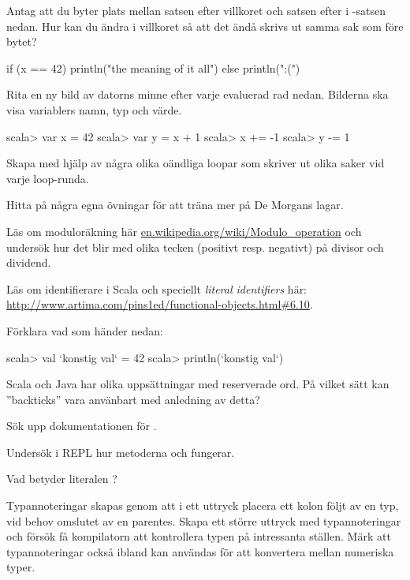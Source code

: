 {{{{{{{\Task\Pen Antag att du byter plats mellan satsen efter villkoret och satsen efter  i -satsen nedan. Hur kan du ändra i villkoret så att det ändå skrivs ut samma sak som före bytet?
\begin{Code}
if (x == 42) println("the meaning of it all") else println(":(")
\end{Code}

\Task\Pen Rita en ny bild av datorns minne efter varje evaluerad rad nedan. Bilderna ska visa variablers namn, typ och värde.
\begin{REPL}
scala> var x = 42
scala> var y = x + 1
scala> x += -1
scala> y -= 1
\end{REPL}

\Task Skapa med hjälp av  några olika oändliga loopar som skriver ut olika saker vid varje loop-runda.

\Task Hitta på några egna övningar för att träna mer på De Morgans lagar.



\clearpage

\AdvancedTasks

\Task Läs om moduloräkning här \href{https://en.wikipedia.org/wiki/Modulo\_operation}{en.wikipedia.org/wiki/Modulo\_operation} och undersök hur det blir med olika tecken (positivt resp. negativt) på divisor och dividend.



\Task Läs om identifierare i Scala och speciellt \emph{literal identifiers} här: \url{http://www.artima.com/pins1ed/functional-objects.html#6.10}.

\Subtask Förklara vad som händer nedan:
\begin{REPLnonum}
scala> val `konstig val` = 42
scala> println(`konstig val`)
\end{REPLnonum}

\Subtask Scala och Java har olika uppsättningar med reserverade ord. På vilket sätt kan ''backticks'' vara använbart med anledning av detta?


\Task Sök upp dokumentationen för .

\Subtask Undersök i REPL hur metoderna  och  fungerar.

\Subtask Vad betyder literalen ?

\Task Typannoteringar skapas genom att i ett uttryck placera ett kolon följt av en typ, vid behov  omslutet av en parentes. Skapa ett större uttryck med typannoteringar och försök få kompilatorn att kontrollera typen på intressanta ställen. Märk att typannoteringar också ibland kan användas för att konvertera mellan numeriska typer.


}}}}}}}
